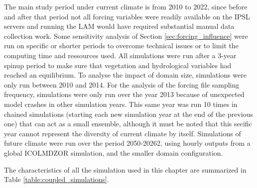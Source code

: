 
The main study period under current climate is from 2010 to 2022, since before and after that period not all forcing variables were readily available on the IPSL servers and running the LAM would have required substantial manual data collection work. Some sensitivity analysis of Section \ref{sec:forcing_influence} were run on specific or shorter periods to overcome technical issues or to limit the computing time and ressources used.
All simulations were run after a 3-year spinup period to make sure that vegetation and hydrological variables had reached an equilibrium. 
To analyse the impact of domain size, simulations were only run between 2010 and 2014. 
For the analysis of the forcing file sampling frequency, simulations were only run over the year 2013 because of unexpected model crashes in other simulation years. This same year was run 10 times in chained simulations (starting each new simulation year at the end of the previous one) that can act as a small ensemble, although it must be noted that this secific year cannot represent the diversity of current climate by itself.
Simulations of future climate were run over the period 2050-20262, using hourly outputs from a global ICOLMDZOR simulation, and the smaller domain configuration. 

The characteristics of all the simulation used in this chapter are summarized in Table \ref{table:coupled_simulations}.

